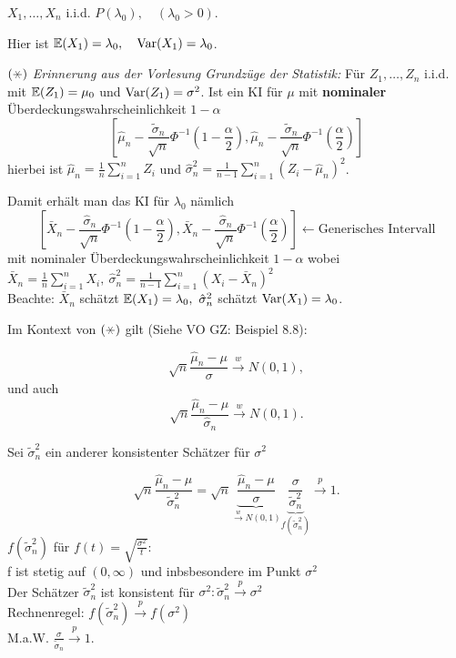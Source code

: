 \documentclass{tstextbook}
\begin{document}
\begin{example}
	$ X_1,\ldots,X_n $ i.i.d. $ P(\lambda_0), \quad (\lambda_0 > 0) $. 
	
	Hier ist $ \mathbb E(X_1)=\lambda_0, \quad \operatorname{Var}(X_1)=\lambda_0 $. 
	
	
	$ (\hexstar) $ \textit{Erinnerung aus der Vorlesung Grundzüge der Statistik:} 
	Für $ Z_1,\ldots, Z_n $ i.i.d. mit $ \mathbb E(Z_1) = \mu_0 $ und $ \operatorname{Var}(Z_1) = \sigma^2 $. Ist ein KI für $ \mu $ mit \textbf{nominaler}  Überdeckungswahrscheinlichkeit $ 1 - \alpha $ 
	\[
	\left[\hat{\mu}_n - \frac{\tilde{\sigma}_n}{\sqrt{n}} \Phi^{-1}\left(1-\frac{\alpha}{2}\right), \hat{\mu}_n - \frac{\tilde{\sigma}_n}{\sqrt{n}}\Phi^{-1}\left(\frac{\alpha}{2}\right) \right]
	\]
	hierbei ist $ \hat{\mu}_n= \frac{1}{n}\sum_{i=1}^{n} Z_i $ und $ \hat{\sigma}_n^2 = \frac{1}{n-1} \sum_{i=1}^{n} (Z_i - \hat{\mu}_n)^2 $.
	
	Damit erhält man das KI für $ \lambda_0 $ nämlich
	\[
	\left[\bar{X}_n - \frac{\hat{\sigma}_n}{\sqrt{n}} \Phi^{-1}\left(1-\frac{\alpha}{2}\right), \bar{X}_n - \frac{\hat{\sigma}_n}{\sqrt{n}} \Phi^{-1}\left(\frac{\alpha}{2}\right) \right] \leftarrow \text{Generisches Intervall}
	\]
	mit nominaler Überdeckungswahrscheinlichkeit $ 1 - \alpha $  wobei $ \bar{X}_n= \frac{1}{n}\sum_{i=1}^{n} X_i , \  \hat{\sigma}_n^2 = \frac{1}{n-1} \sum_{i=1}^{n} (X_i - \bar{X}_n)^2 $ 	\\
	
	Beachte: $\bar{X}_n$ schätzt $ \E(X_1)= \lambda_0, \ \hat{\sigma}_n^2 $ schätzt $ \operatorname{Var}(X_1) = \lambda_0 $.
	
	Im Kontext von $ (\hexstar) $ gilt (Siehe VO GZ: Beispiel 8.8): 
	
	\[
	\sqrt{n} \frac{\hat{\mu}_n-\mu}{\sigma} \overset{w}{\longrightarrow} N(0,1), 
	\] und auch
	\[
	\sqrt{n} \frac{\hat{\mu}_n-\mu}{\hat{\sigma}_n} \overset{w}{\longrightarrow} N(0,1). 
	\]
	
	Sei $ \tilde{\sigma}_n^2 $ ein anderer konsistenter Schätzer für $ \sigma^2 $
	
	\[
	\sqrt{n} \frac{\hat{\mu}_n - \mu}{\tilde{\sigma}_n^2} = \sqrt{n} \underbrace{\frac{\hat{\mu}_n - \mu}{\sigma}}_{\xrightarrow{w}N(0,1)} 
	\underbrace{\frac{\sigma}{\tilde{\sigma}_n^2}}_{ f( \tilde{\sigma}_n^2) }
	\xrightarrow{p} 1.
	\]
	$f( \tilde{\sigma}_n^2)$ für $f(t) = \sqrt{\frac{\sigma^2}{t}} $: \\ 
	f ist stetig auf $(0, \infty)$ und inbsbesondere im Punkt $\sigma^2$ \\ 	
	Der Schätzer $\tilde{\sigma}_n^2$ ist konsistent für $\sigma^2 : \tilde{\sigma}_n^2 \xrightarrow{p} \sigma^2 $\\ 
	Rechnenregel: $ f( \tilde{\sigma}_n^2 ) \xrightarrow{p} f( \sigma^2)$ \\ 	
	M.a.W. $\frac{\sigma}{ \tilde{\sigma}_n} \xrightarrow{p} 1$. \\
	

\end{example}
\end{document}
